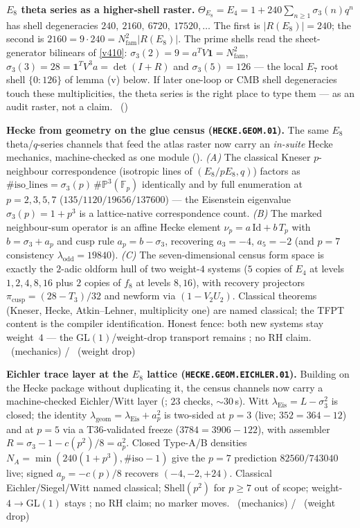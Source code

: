 \documentclass[11pt,a4paper]{article}
\newcommand{\Nfam}{N_{\mathrm{fam}}}
\theoremstyle{definition}
\begin{document}
\par\smallskip\noindent\textbf{$E_8$ theta series as a higher-shell raster.}
$\Theta_{E_8}=E_4=1+240\sum_{n\ge1}\sigma_3(n)q^n$ has shell degeneracies
$240,\ 2160,\ 6720,\ 17520,\dots$ The first is $|R(E_8)|=240$; the second is
$2160=9\cdot240=\Nfam^2|R(E_8)|$. The prime shells read the sheet-generator bilinears of \vref{v410}:
$\sigma_3(2)=9=a^TV\mathbf 1=\Nfam^2$, $\sigma_3(3)=28=\mathbf 1^TV^3a=\det(I{+}R)$ and
$\sigma_3(5)=126$ --- the local $E_7$ root shell $\{0{:}126\}$ of lemma (v) below. If later one-loop or CMB
shell degeneracies touch these multiplicities, the theta series is the right place to type them --- as an
audit raster, not a claim. \mO\ ()

\par\smallskip\noindent\textbf{Hecke from geometry on the glue census (\texttt{HECKE.GEOM.01}).}
The same $E_8$ theta/$q$-series channels that feed the atlas raster now carry an
\emph{in-suite} Hecke mechanics, machine-checked as one module
(). \emph{(A)} The classical Kneser $p$-neighbour
correspondence (isotropic lines of $(E_8/pE_8,q)$) factors as
$\#\mathrm{iso\_lines}=\sigma_3(p)\,\#\mathbb P^3(\mathbb F_p)$ identically and by full
enumeration at $p=2,3,5,7$ ($135/1120/19656/137600$) --- the Eisenstein eigenvalue
$\sigma_3(p)=1+p^3$ is a lattice-native correspondence count. \emph{(B)} The marked
neighbour-sum operator is an affine Hecke element
$\nu_p=a\,\mathrm{Id}+b\,T_p$ with $b=\sigma_3+a_p$ and cusp rule $a_p=b-\sigma_3$,
recovering $a_3=-4$, $a_5=-2$ (and $p=7$ consistency $\lambda_{\mathrm{odd}}=19840$).
\emph{(C)} The seven-dimensional census form space is exactly the $2$-adic oldform hull of
two weight-$4$ systems ($5$ copies of $E_4$ at levels $1,2,4,8,16$ plus $2$ copies of
$f_8$ at levels $8,16$), with recovery projectors
$\pi_{\mathrm{cusp}}=(28-T_3)/32$ and newform via $(1-V_2U_2)$.
Classical theorems (Kneser, Hecke, Atkin--Lehner, multiplicity one) are named classical;
the TFPT content is the compiler identification. Honest fence: both new systems stay
weight~$4$ --- the GL$(1)$/weight-drop transport remains \mO; no RH claim.
\mE\ (mechanics) / \mO\ (weight drop)

\par\smallskip\noindent\textbf{Eichler trace layer at the $E_8$ lattice
(\texttt{HECKE.GEOM.EICHLER.01}).}
Building on the Hecke package without duplicating it, the census channels now carry a
machine-checked Eichler/Witt layer (; $23$ checks,
$\sim30$\,s). Witt $\lambda_{\mathrm{Eis}}=L-\sigma_3^2$ is closed; the identity
$\lambda_{\mathrm{geom}}=\lambda_{\mathrm{Eis}}+a_p^2$ is two-sided at $p=3$ (live;
$352=364-12$) and at $p=5$ via a T36-validated freeze ($3784=3906-122$), with assembler
$R=\sigma_3-1-c(p^2)/8=a_p^2$. Closed Type-A/B densities
$N_A=\min(240(1+p^3),\#\mathrm{iso}-1)$ give the $p=7$ prediction $82560/743040$ live;
signed $a_p=-c(p)/8$ recovers $(-4,-2,+24)$. Classical Eichler/Siegel/Witt named classical;
$\mathrm{Shell}(p^2)$ for $p\ge7$ out of scope; weight-$4\to$GL$(1)$ stays \mO; no RH claim;
no marker moves.
\mE\ (mechanics) / \mO\ (weight drop)
\end{document}
